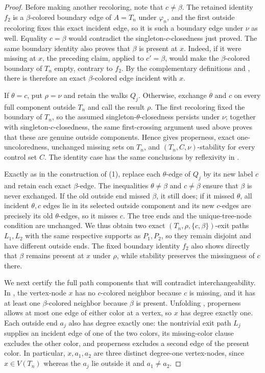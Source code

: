 \begin{proof}
Before making another recoloring, note that $c\ne\beta$.  The retained
identity $f_2$ is a $\beta$-colored boundary edge of $A=T_n$ under
$\varphi_n$, and the first outside recoloring fixes this exact incident
edge, so it is such a boundary edge under $\nu$ as well.  Equality
$c=\beta$ would contradict the singleton-$c$-closedness just proved.
The same boundary identity also proves that $\beta$ is present at $x$.
Indeed, if it were missing at $x$, the preceding claim, applied to
$c'=\beta$, would make the $\beta$-colored boundary of $T_n$ empty,
contrary to $f_2$.  By the complementary definitions
 and , there is therefore
an exact $\beta$-colored edge incident with $x$.

If $\theta=c$, put $\rho=\nu$ and retain the walks $Q_j$.  Otherwise,
exchange $\theta$ and $c$ on every full component outside $T_n$ and call
the result $\rho$.  The first recoloring fixed the boundary of $T_n$, so
the assumed singleton-$\theta$-closedness persists under $\nu$; together
with singleton-$c$-closedness, the same first-crossing argument used above
proves that these are genuine outside components.  Hence
 gives properness, exact
one-uncoloredness, unchanged missing sets on $T_n$, and
$(T_n,C,\nu)$-stability for every control set $C$.  The identity case has
the same conclusions by reflexivity in .

Exactly as in the construction of (1), replace each $\theta$-edge of
$Q_j$ by its new label $c$ and retain each exact $\beta$-edge.  The
inequalities $\theta\ne\beta$ and $c\ne\beta$ ensure that $\beta$ is
never exchanged.  If the old outside end missed $\beta$, it still does;
if it missed $\theta$, all incident $\theta,c$ edges lie in its selected
outside component and its new $c$-edges are precisely its old
$\theta$-edges, so it misses $c$.  The tree ends and the unique-tree-node
condition are unchanged.  We thus obtain two exact
$(T_n,\rho,\{c,\beta\})$-exit paths $L_1,L_2$ with the same respective
supports as $P_1,P_2$, so they remain disjoint and have different outside
ends.  The fixed boundary identity $f_2$ also shows directly that
$\beta$ remains present at $x$ under $\rho$, while stability preserves
the missingness of $c$ there.

We next certify the full path components that will contradict
interchangeability.  In , the vertex-node
$x$ has no $c$-colored neighbor because $c$ is missing, and it has at
least one $\beta$-colored neighbor because $\beta$ is present.  Unfolding
, properness allows at most one edge of
either color at a vertex, so $x$ has degree exactly one.  Each outside
end $a_j$ also has degree exactly one: the
nontrivial exit path $L_j$ supplies an incident edge of one of the two
colors, its missing-color clause excludes the other color, and properness
excludes a second edge of the present color.  In particular, $x,a_1,a_2$
are three distinct degree-one vertex-nodes, since $x\in V(T_n)$ whereas
the $a_j$ lie outside it and $a_1\ne a_2$.


\end{proof}
